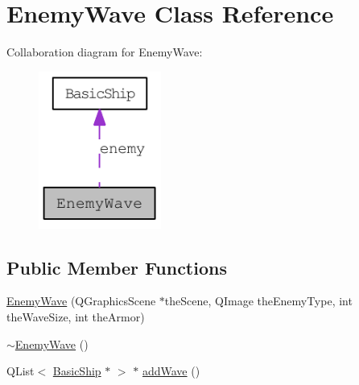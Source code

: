\hypertarget{class_enemy_wave}{
\section{EnemyWave Class Reference}
\label{class_enemy_wave}
}
Collaboration diagram for EnemyWave:\nopagebreak
\begin{figure}[H]
\begin{center}
\leavevmode
\includegraphics[width=114pt]{class_enemy_wave__coll__graph}
\end{center}
\end{figure}
\subsection*{Public Member Functions}
\begin{DoxyCompactItemize}
\item 
\hyperlink{class_enemy_wave_a187dbe0f6d62c4b72570c707bdd06cdc}{EnemyWave} (QGraphicsScene $\ast$theScene, QImage theEnemyType, int theWaveSize, int theArmor)
\item 
\hyperlink{class_enemy_wave_aa33b60498a02e1543cdcf479e004ef1c}{$\sim$EnemyWave} ()
\item 
QList$<$ \hyperlink{class_basic_ship}{BasicShip} $\ast$ $>$ $\ast$ \hyperlink{class_enemy_wave_a804ba9a3d38d5050decbf58c18c06851}{addWave} ()
\end{DoxyCompactItemize}
